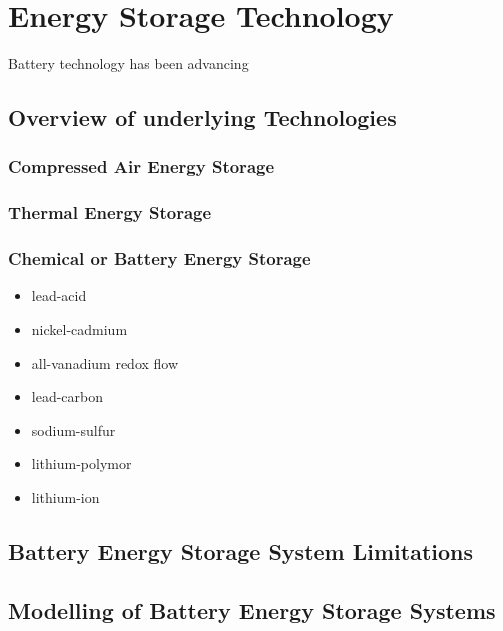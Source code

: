 \section{Energy Storage Technology}
\label{ch-review:sec:energy-storage-technology}

Battery technology has been advancing 

\subsection{Overview of underlying Technologies}

\subsubsection{Compressed Air Energy Storage}

\subsubsection{Thermal Energy Storage}

\subsubsection{Chemical or Battery Energy Storage}

\begin{itemize}
	\item lead-acid
	\item nickel-cadmium
	\item all-vanadium redox flow
	\item lead-carbon
	\item sodium-sulfur
	\item lithium-polymor
	\item lithium-ion
\end{itemize}

\subsection{Battery Energy Storage System Limitations}

\subsection{Modelling of Battery Energy Storage Systems}